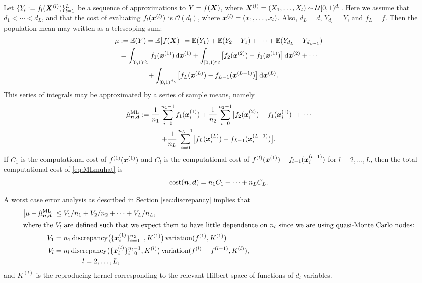 \documentclass{svproc}
\begin{document}
Let $\{Y_l := f_l({\boldsymbol{X}}^{(l)})\}_{l=1}^L$ be a sequence of approximations to $Y = f({\boldsymbol{X}})$, where ${\boldsymbol{X}}^{(l)} = (X_1, \ldots, X_l) \sim \mathcal{U}[0,1)^{d_l}$.  Here we assume that $d_1 < \cdots < d_L$, and that the cost of evaluating $f_l({\boldsymbol{x}}^{(l)})$ is $\mathcal{O}(d_l)$, where ${\boldsymbol{x}}^{(l)} = (x_1, \ldots, x_l)$.  Also, $d_L = d$, $Y_{d_L} = Y$, and $f_L = f$. Then the population mean may written as a telescoping sum:
\begin{align*}
    \mu & := \mathbb{E}(Y) = \mathbb{E}\bigl[f({\boldsymbol{X}})\bigr]
    = \mathbb{E}(Y_1) + \mathbb{E}(Y_2 - Y_1) + \cdots + \mathbb{E}(Y_{d_L} - Y_{d_{L-1}}) \\
    & = \int_{[0,1)^{d_1}} f_1({\boldsymbol{x}}^{(1)}) \, \mathrm{d} {\boldsymbol{x}}^{(1)} +  \int_{[0,1)^{d_2}} \bigl[f_2({\boldsymbol{x}}^{(2)}) - f_1({\boldsymbol{x}}^{(1)})\bigr] \, \mathrm{d} {\boldsymbol{x}}^{(2)} + \cdots \\
    & \qquad \qquad + \int_{[0,1)^{d_L}} \bigl[f_L({\boldsymbol{x}}^{(L)}) - f_{L-1}({\boldsymbol{x}}^{(L-1)}) \bigr] \, \mathrm{d} {\boldsymbol{x}}^{(L)}.
\end{align*}
This series of integrals may be approximated by a series of sample means, namely
\begin{multline} \label{eq:MLmuhat}
    \hat{\mu}^{\text{ML}}_{{\boldsymbol{n}},{\boldsymbol{d}}}  := \frac{1}{n_1}  \sum_{i=0}^{n_1-1} f_1({\boldsymbol{x}}^{(1)}_i)  +  \frac{1}{n_2}  \sum_{i=0}^{n_2-1}  \bigl[f_2({\boldsymbol{x}}^{(2)}_i) - f_1({\boldsymbol{x}}^{(1)}_i)\bigr] + \cdots \\
     + \frac{1}{n_L}  \sum_{i=0}^{n_L-1}  \bigl[f_L({\boldsymbol{x}}_i^{(L)}) - f_{L-1}({\boldsymbol{x}}_i^{(L-1)}) \bigr].
\end{multline}
If $C_1$ is the computational cost of $f^{(1)}({\boldsymbol{x}}^{(1)})$ and $C_l$ is the computational cost of $f^{(l)}({\boldsymbol{x}}^{(1)}) - f_{l-1}({\boldsymbol{x}}_i^{(l-1)})$ for $l = 2, \ldots, L$, then the total computational cost of 
\eqref{eq:MLmuhat} is 
\begin{equation} \label{eq:MLcostdef}
    \text{cost}({\boldsymbol{n}},{\boldsymbol{d}}) = n_1 C_1 + \cdots + n_L C_L.
\end{equation}

A worst case error analysis as described in Section \ref{sec:discrepancy} implies that
\begin{align}
    \label{eq:MLerrbd}
    \bigl \lvert \mu - \hat{\mu}^{\text{ML}}_{{\boldsymbol{n}},{\boldsymbol{d}}} \bigr \rvert &\le
    V_1/n_1 + V_2/n_2 + \cdots + V_L/n_L,  \\
    \intertext{where the $V_l$ are defined such that we expect them to have little dependence on $n_l$ since we are using quasi-Monte Carlo nodes:} 
    \nonumber
    V_1 &= n_1 \, \text{discrepancy}\bigl(\{{\boldsymbol{x}}_i^{(1)}\}_{i=0}^{n_2-1}, K^{(1)} \bigr) \, \text{variation}(f^{(1)}, K^{(1)})\\
    \nonumber
    V_l & = n_l \,\text{discrepancy}\bigl(\{{\boldsymbol{x}}_i^{(l)}\}_{i=0}^{n_l-1}, K^{(l)} \bigr) \, \text{variation}(f^{(l)} - f^{(l-1)}, K^{(l)}), \\
    \nonumber
    & \qquad \qquad l = 2, \ldots, L,
\end{align}
and $K^{(l)}$ is the reproducing kernel corresponding to the relevant  Hilbert space of functions of $d_l$ variables.  
\end{document}
